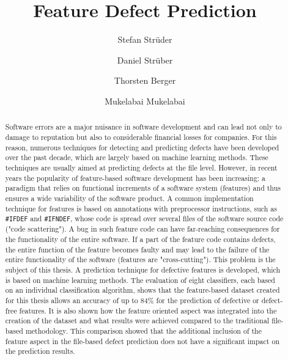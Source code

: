 \documentclass[sigconf]{acmart}
\begin{document}
\title{Feature Defect Prediction}
\renewcommand{\shorttitle}{}

\author{Stefan Strüder}

\author{Daniel Strüber}

\author{Thorsten Berger}

\author{Mukelabai Mukelabai}

\renewcommand{\shortauthors}{}


\begin{abstract}
Software errors are a major nuisance in software development and can lead not only to damage to reputation but also to considerable financial losses for companies. For this reason, numerous techniques for detecting and predicting defects have been developed over the past decade, which are largely based on machine learning methods. These techniques are usually aimed at predicting defects at the file level. However, in recent years the popularity of feature-based software development has been increasing: a paradigm that relies on functional increments of a software system (features) and thus ensures a wide variability of the software product. A common implementation technique for features is based on annotations with preprocessor instructions, such as \texttt{\#IFDEF} and \texttt{\#IFNDEF}, whose code is spread over several files of the software source code ("code scattering"). A bug in such feature code can have far-reaching consequences for the functionality of the entire software. If a part of the feature code contains defects, the entire function of the feature becomes faulty and may lead to the failure of the entire functionality of the software (features are "cross-cutting"). This problem is the subject of this thesis. A prediction technique for defective features is developed, which is based on machine learning methods. The evaluation of eight classifiers, each based on an individual classification algorithm, shows that the feature-based dataset created for this thesis allows an accuracy of up to 84\% for the prediction of defective or defect-free features. It is also shown how the feature oriented aspect was integrated into the creation of the dataset and what results were achieved compared to the traditional file-based methodology. This comparison showed that the additional inclusion of the feature aspect in the file-based defect prediction does not have a significant impact on the prediction results.

\end{abstract}
\end{document}
